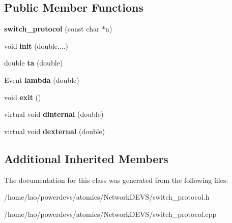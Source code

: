 \subsection*{Public Member Functions}
\begin{DoxyCompactItemize}
\item 
{\bfseries switch\+\_\+protocol} (const char $\ast$n)\hypertarget{classswitch__protocol_a037a81b094ccb233381c4ec1946ddf9e}{}\label{classswitch__protocol_a037a81b094ccb233381c4ec1946ddf9e}

\item 
void {\bfseries init} (double,...)\hypertarget{classswitch__protocol_a30d2fd8c73d49279d47575ead34b814b}{}\label{classswitch__protocol_a30d2fd8c73d49279d47575ead34b814b}

\item 
double {\bfseries ta} (double)\hypertarget{classswitch__protocol_aeeb0a3aff7b4adc03f328b3b22eba76f}{}\label{classswitch__protocol_aeeb0a3aff7b4adc03f328b3b22eba76f}

\item 
Event {\bfseries lambda} (double)\hypertarget{classswitch__protocol_a359850b42911d74507b5a9bc3de689ea}{}\label{classswitch__protocol_a359850b42911d74507b5a9bc3de689ea}

\item 
void {\bfseries exit} ()\hypertarget{classswitch__protocol_a508f4ca6ad0341274a3b274a2610fb8c}{}\label{classswitch__protocol_a508f4ca6ad0341274a3b274a2610fb8c}

\item 
virtual void {\bfseries dinternal} (double)\hypertarget{classswitch__protocol_a7dd0e54d6b2a3683a5be387cffa99a22}{}\label{classswitch__protocol_a7dd0e54d6b2a3683a5be387cffa99a22}

\item 
virtual void {\bfseries dexternal} (double)\hypertarget{classswitch__protocol_a93b0465ace315872626f2f04c29b55f3}{}\label{classswitch__protocol_a93b0465ace315872626f2f04c29b55f3}

\end{DoxyCompactItemize}
\subsection*{Additional Inherited Members}


The documentation for this class was generated from the following files\+:\begin{DoxyCompactItemize}
\item 
/home/lao/powerdevs/atomics/\+Network\+D\+E\+V\+S/switch\+\_\+protocol.\+h\item 
/home/lao/powerdevs/atomics/\+Network\+D\+E\+V\+S/switch\+\_\+protocol.\+cpp\end{DoxyCompactItemize}
